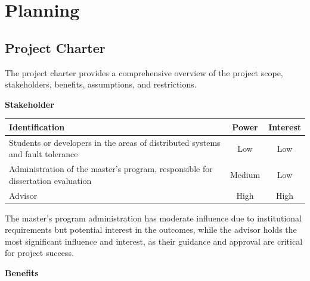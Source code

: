 % 
\chapter{Planning} %


\section{Project Charter}

The project charter provides a comprehensive overview of the project scope, stakeholders, benefits, assumptions, and restrictions.

\noindent \textbf{Stakeholder}

\begin{table}[h!]
      \centering
      \begin{tabular}{|p{11cm}|c|c|}
            \hline
            \textbf{Identification}                                                         & \textbf{Power} & \textbf{Interest} \\ \hline
            Students or developers in the areas of distributed systems and fault tolerance  & Low            & Low               \\ \hline
            Administration of the master's program, responsible for dissertation evaluation & Medium         & Low               \\ \hline
            Advisor                                                                         & High           & High              \\ \hline
      \end{tabular}
\end{table}

The master's program administration has moderate influence due to institutional requirements but potential interest in the outcomes, while the advisor holds the most significant influence and interest, as their guidance and approval are critical for project success.

\textbf{Benefits}

